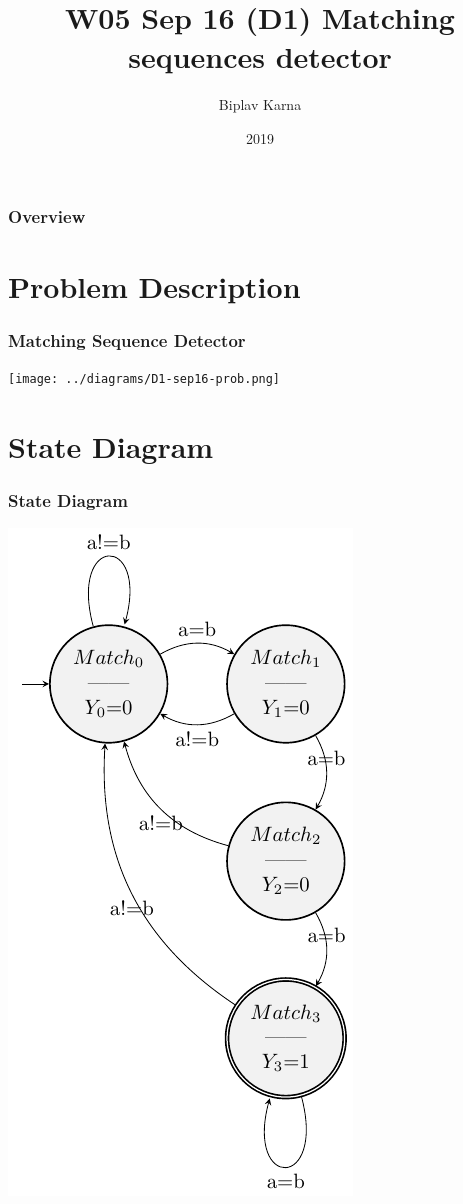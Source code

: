 \documentclass{beamer}
\title{W05 Sep 16 (D1) Matching sequences detector}
\author{Biplav Karna}
\institute{USN Kongsberg}
\date{2019}
\begin{document}
 
\frame{\titlepage}
 
\begin{frame}
\frametitle{Overview}
\tableofcontents
\end{frame}

\section{Problem Description}
\begin{frame}
\frametitle{Matching Sequence Detector}
\texttt{[image: ../diagrams/D1-sep16-prob.png]}
\end{frame}
 
\section{State Diagram}
\begin{frame}
\frametitle{State Diagram}
\includegraphics[height=0.8\textheight] {../diagrams/state-diagram.pdf}
\end{frame}
 
\end{document}
